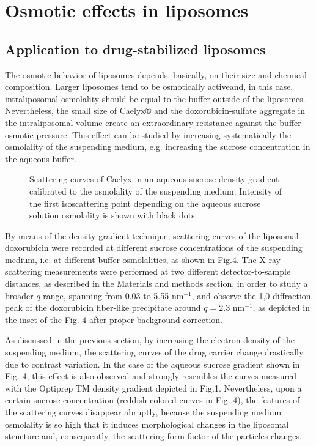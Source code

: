 \section{Osmotic effects in liposomes}
\subsection{Application to drug-stabilized liposomes}
The osmotic behavior of liposomes depends, basically, on their size and chemical composition. Larger liposomes tend to be osmotically activeand, in this case, intraliposomal osmolality should be equal to the buffer outside of the liposomes. Nevertheless, the small size of Caelyx® and the doxorubicin-sulfate aggregate in the intraliposomal volume create an extraordinary resistance against the buffer osmotic pressure. This effect can be studied by increasing systematically the osmolality of the suspending medium, e.g. increasing the sucrose concentration in the aqueous buffer.

\begin{figure}
	\centering
		\caption{Scattering curves of Caelyx in an aqueous sucrose density gradient calibrated to the osmolality of the suspending medium. Intensity of the first isoscattering point depending on the aqueous sucrose solution osmolality is shown with black dots.}
\end{figure}

By means of the density gradient technique, scattering curves of the liposomal doxorubicin were recorded at different sucrose concentrations of the suspending medium, i.e. at different buffer osmolalities, as shown in Fig.4. The X-ray scattering measurements were performed at two different detector-to-sample distances, as described in the Materials and methods section, in order to study a broader $q$-range, spanning from 0.03 to 5.55 nm$^{-1}$, and observe the 1,0-diffraction peak of the doxorubicin fiber-like precipitate around $q=2.3$ nm$^{-1}$, as depicted in the inset of the Fig. 4 after proper background correction.

As discussed in the previous section, by increasing the electron density of the suspending medium, the scattering curves of the drug carrier change drastically due to contrast variation. In the case of the aqueous sucrose gradient shown in Fig. 4, this effect is also observed and strongly resembles the curves measured with the Optiprep TM density gradient depicted in Fig.1. Nevertheless, upon a certain sucrose concentration (reddish colored curves in Fig. 4), the features of the scattering curves disappear abruptly, because the suspending medium osmolality is so high that it induces morphological changes in the liposomal structure and, consequently, the scattering form factor of the particles changes.

